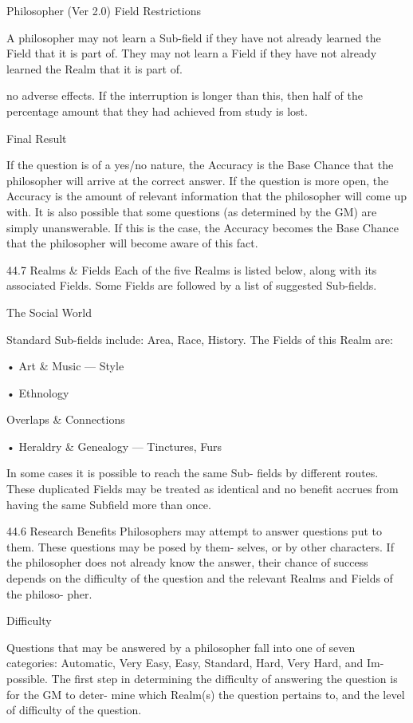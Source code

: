 \begin{Chapter}{Philosopher (Ver 2.0)}
Field Restrictions 

A  philosopher  may  not  learn  a  Sub-field  if  they 
have not already learned the Field that it is part of. 
They may not learn a Field if they have not already 
learned the Realm that it is part of. 

no adverse effects. If the interruption is longer than 
this,  then  half  of  the  percentage  amount  that  they 
had achieved from study is lost. 

Final Result 

If the question is of a  yes/no nature, the Accuracy 
is the Base Chance that the philosopher will arrive 
at the correct answer. If the question is more open, 
the Accuracy is the amount of relevant information 
that  the  philosopher  will  come  up  with.  It  is  also 
possible that some questions (as determined by the 
GM)  are  simply  unanswerable.  If  this  is  the  case, 
the  Accuracy  becomes  the  Base  Chance  that  the 
philosopher will become aware of this fact. 

44.7 Realms \& Fields 
Each of the five Realms is listed below, along with 
its  associated  Fields.  Some  Fields  are  followed  by 
a list of suggested Sub-fields. 

The Social World 

Standard  Sub-fields  include:  Area,  Race,  History. 
The Fields of this Realm are:  

• Art \& Music — Style  

• Ethnology  

Overlaps \& Connections 

• Heraldry \& Genealogy — Tinctures, Furs  

In some cases it is possible to reach the same Sub-
fields  by  different  routes.  These  duplicated  Fields 
may  be  treated  as  identical  and no  benefit  accrues 
from having the same Subfield more than once. 

44.6 Research Benefits 
Philosophers  may  attempt  to  answer  questions  put 
to  them.  These  questions  may  be  posed  by  them-
selves,  or  by  other  characters.  If  the  philosopher 
does not already know the answer, their chance of 
success  depends  on  the  difficulty  of  the  question 
and the relevant Realms and Fields of the philoso-
pher. 

Difficulty 

Questions  that  may  be  answered  by  a  philosopher 
fall  into  one  of  seven  categories:  Automatic,  Very 
Easy,  Easy,  Standard,  Hard,  Very  Hard,  and  Im-
possible. The first step in determining the difficulty 
of  answering  the  question  is  for  the  GM  to  deter-
mine which Realm(s) the question pertains to, and 
the level of difficulty of the question. 


\end{Chapter}
